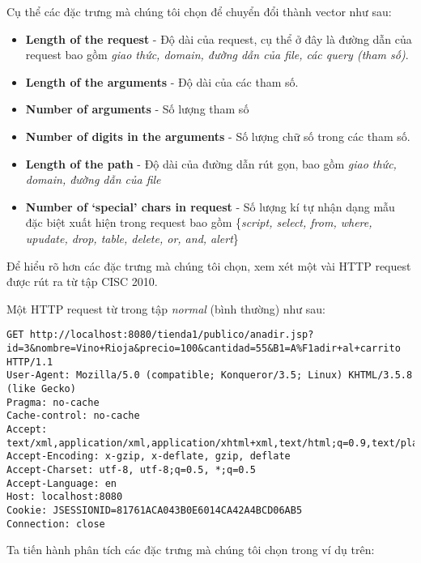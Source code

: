 \documentclass[../main-report.tex]{subfiles}
\begin{document}
Cụ thể các đặc trưng mà chúng tôi chọn để chuyển đổi thành vector như sau:

\begin{itemize}
\item \textbf{Length of the request} - Độ dài của request, cụ thể ở đây là đường dẫn của request bao gồm \emph{giao thức, domain, đường dẫn của file, các query (tham số)}.
\item \textbf{Length  of the arguments} - Độ dài của các tham số.
\item \textbf{Number of arguments} - Số lượng tham số
\item \textbf{Number of digits in the arguments} - Số lượng chữ số trong các tham số.
\item \textbf{Length of the path} - Độ dài của đường dẫn rút gọn, bao gồm \emph{giao thức, domain, đường dẫn của file}
\item \textbf{Number of `special' chars in request} - Số lượng kí tự nhận dạng mẫu đặc biệt xuất hiện trong request bao gồm \{\emph{script, select, from, where, upudate, drop, table, delete, or, and, alert}\}
\end{itemize}

Để hiểu rõ hơn các đặc trưng mà chúng tôi chọn, xem xét một vài HTTP request được rút ra từ tập CISC 2010.

\begin{example}
Một HTTP request từ trong tập \emph{normal} (bình thường) như sau:

\begin{lstlisting}
GET http://localhost:8080/tienda1/publico/anadir.jsp?id=3&nombre=Vino+Rioja&precio=100&cantidad=55&B1=A%F1adir+al+carrito HTTP/1.1
User-Agent: Mozilla/5.0 (compatible; Konqueror/3.5; Linux) KHTML/3.5.8 (like Gecko)
Pragma: no-cache
Cache-control: no-cache
Accept: text/xml,application/xml,application/xhtml+xml,text/html;q=0.9,text/plain;q=0.8,image/png,*/*;q=0.5
Accept-Encoding: x-gzip, x-deflate, gzip, deflate
Accept-Charset: utf-8, utf-8;q=0.5, *;q=0.5
Accept-Language: en
Host: localhost:8080
Cookie: JSESSIONID=81761ACA043B0E6014CA42A4BCD06AB5
Connection: close
\end{lstlisting}
\end{example} 

Ta tiến hành phân tích các đặc trưng mà chúng tôi chọn trong ví dụ trên:
\end{document}
